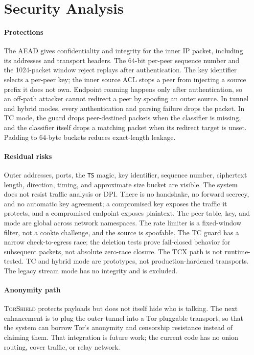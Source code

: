 \documentclass[conference]{IEEEtran}
\newcommand{\sys}{\textsc{TorShield}}
\newcommand{\code}[1]{\texttt{#1}}
\begin{document}
\section{Security Analysis}

\paragraph{Protections}
The AEAD gives confidentiality and integrity for the inner IP packet, including its addresses and transport headers. The 64-bit per-peer sequence number and the 1024-packet window reject replays after authentication. The key identifier selects a per-peer key; the inner source ACL stops a peer from injecting a source prefix it does not own. Endpoint roaming happens only after authentication, so an off-path attacker cannot redirect a peer by spoofing an outer source. In tunnel and hybrid modes, every authentication and parsing failure drops the packet. In TC mode, the guard drops peer-destined packets when the classifier is missing, and the classifier itself drops a matching packet when its redirect target is unset. Padding to 64-byte buckets reduces exact-length leakage.

\paragraph{Residual risks}
Outer addresses, ports, the \code{TS} magic, key identifier, sequence number, ciphertext length, direction, timing, and approximate size bucket are visible. The system does not resist traffic analysis or DPI. There is no handshake, no forward secrecy, and no automatic key agreement; a compromised key exposes the traffic it protects, and a compromised endpoint exposes plaintext. The peer table, key, and mode are global across network namespaces. The rate limiter is a fixed-window filter, not a cookie challenge, and the source is spoofable. The TC guard has a narrow check-to-egress race; the deletion tests prove fail-closed behavior for subsequent packets, not absolute zero-race closure. The TCX path is not runtime-tested. TC and hybrid mode are prototypes, not production-hardened transports. The legacy stream mode has no integrity and is excluded.

\paragraph{Anonymity path}
\sys{} protects payloads but does not itself hide who is talking. The next enhancement is to plug the outer tunnel into a Tor pluggable transport, so that the system can borrow Tor's anonymity and censorship resistance instead of claiming them. That integration is future work; the current code has no onion routing, cover traffic, or relay network.
\end{document}
